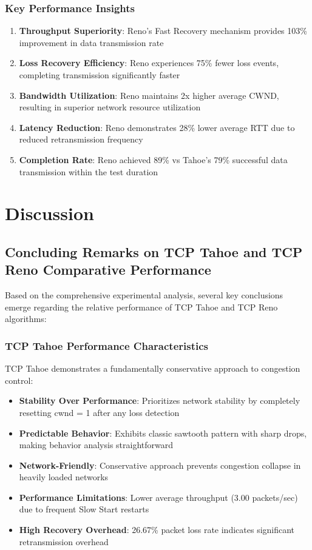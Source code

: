 \documentclass[12pt]{article}
\begin{document}
\subsubsection{Key Performance Insights}

\begin{enumerate}
    \item \textbf{Throughput Superiority}: Reno's Fast Recovery mechanism provides 103\% improvement in data transmission rate
    \item \textbf{Loss Recovery Efficiency}: Reno experiences 75\% fewer loss events, completing transmission significantly faster
    \item \textbf{Bandwidth Utilization}: Reno maintains 2x higher average CWND, resulting in superior network resource utilization
    \item \textbf{Latency Reduction}: Reno demonstrates 28\% lower average RTT due to reduced retransmission frequency
    \item \textbf{Completion Rate}: Reno achieved 89\% vs Tahoe's 79\% successful data transmission within the test duration
\end{enumerate}

\section{Discussion}

\subsection{Concluding Remarks on TCP Tahoe and TCP Reno Comparative Performance}

Based on the comprehensive experimental analysis, several key conclusions emerge regarding the relative performance of TCP Tahoe and TCP Reno algorithms:

\subsubsection{TCP Tahoe Performance Characteristics}
TCP Tahoe demonstrates a fundamentally conservative approach to congestion control:

\begin{itemize}
    \item \textbf{Stability Over Performance}: Prioritizes network stability by completely resetting cwnd = 1 after any loss detection
    \item \textbf{Predictable Behavior}: Exhibits classic sawtooth pattern with sharp drops, making behavior analysis straightforward
    \item \textbf{Network-Friendly}: Conservative approach prevents congestion collapse in heavily loaded networks
    \item \textbf{Performance Limitations}: Lower average throughput (3.00 packets/sec) due to frequent Slow Start restarts
    \item \textbf{High Recovery Overhead}: 26.67\% packet loss rate indicates significant retransmission overhead
\end{itemize}
\end{document}
